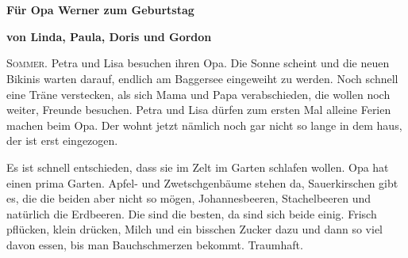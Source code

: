 \pagestyle{empty}
\section*{}
\centerline{\Huge \color{red}\SixFlowerPetalDotted}
\vspace{13pt}
\centerline{\bf \large\color{red}Für Opa Werner zum Geburtstag }
\vspace{13pt}
\centerline{\bf \color{red} von Linda, Paula, Doris und Gordon}
\vspace{13pt}
\centerline{\huge \color{red}\SixFlowerPetalDotted}
\vspace{13pt}
\centerline{\LARGE \color{red}\SixFlowerPetalDotted}
\vspace{13pt}
\centerline{\Large \color{red}\SixFlowerPetalDotted}
\vspace{13pt}
\centerline{\large \color{red}\SixFlowerPetalDotted}
\vspace{13pt}
\centerline{\normalsize \color{red}\SixFlowerPetalDotted}
\vspace{13pt}
\centerline{\small \color{red}\SixFlowerPetalDotted}
\vspace{13pt}
\centerline{\footnotesize \color{red}\SixFlowerPetalDotted}
\vspace{13pt}
\centerline{\scriptsize \color{red}\SixFlowerPetalDotted}
\vspace{13pt}
\centerline{\tiny \color{red}\SixFlowerPetalDotted}

\newpage
\pagestyle{scrheadings}


\lettrine[lines=3]{\color{red}S}{ommer.} Petra und Lisa besuchen ihren Opa. Die Sonne scheint und die neuen Bikinis warten darauf, endlich am Baggersee eingeweiht zu werden. Noch schnell eine Träne verstecken, als sich Mama und Papa verabschieden, die wollen noch weiter, Freunde besuchen. Petra und Lisa dürfen zum ersten Mal alleine Ferien machen beim Opa. Der wohnt jetzt nämlich noch gar nicht so lange in dem haus, der ist erst eingezogen.

Es ist schnell entschieden, dass sie im Zelt im Garten schlafen wollen. Opa hat einen prima Garten. Apfel- und Zwetschgenbäume stehen da, Sauerkirschen gibt es, die die beiden aber nicht so mögen, Johannesbeeren, Stachelbeeren und natürlich die Erdbeeren. Die sind die besten, da sind sich beide einig. Frisch pflücken, klein drücken, Milch und ein bisschen Zucker dazu und dann so viel davon essen, bis man Bauchschmerzen bekommt. Traumhaft.

